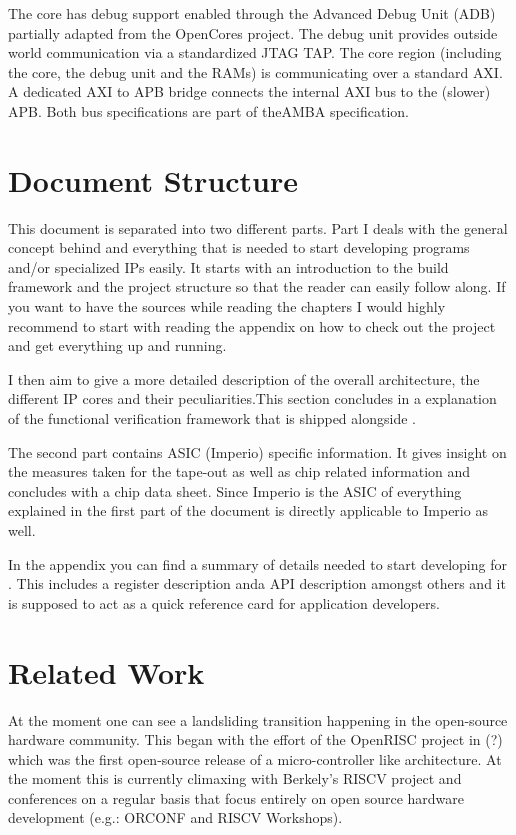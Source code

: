 The core has debug support enabled through the Advanced Debug Unit (ADB) partially adapted from the OpenCores project. The debug unit provides outside world communication via a standardized JTAG TAP. The core region (including the core, the debug unit and the RAMs) is communicating over a standard \gls{AXI}. A dedicated AXI to APB bridge connects the internal AXI bus to the (slower) \gls{APB}. Both bus specifications are part of the\gls{AMBA} specification.

\section{Document Structure}

This document is separated into two different parts. Part I deals with the general concept behind \pulpino and everything that is needed to start developing programs and/or specialized IPs easily. It starts with an introduction to the build framework and the project structure so that the reader can easily follow along. If you want to have the sources while reading the chapters I would highly recommend to start with reading the appendix on how to check out the project and get everything up and running.

I then aim to give a more detailed description of the overall architecture, the different IP cores and their peculiarities.This section concludes in a explanation of the functional verification framework that is shipped alongside \pulpino.

The second part contains ASIC (Imperio) specific information. It gives insight on the measures taken for the tape-out as well as chip related information and concludes with a chip data sheet. Since Imperio is the ASIC of \pulpino everything explained in the first part of the document is directly applicable to Imperio as well.

In the appendix you can find a summary of details needed to start developing for \pulpino. This includes a register description anda API description amongst others and it is supposed to act as a quick reference card for application developers.

\section{Related Work}

At the moment one can see a landsliding transition happening in the open-source hardware community. This began with the effort of the OpenRISC project in (?) which was the first open-source release of a micro-controller like architecture.
At the moment this is currently climaxing with Berkely's RISCV project and conferences on a regular basis that focus entirely on open source hardware development (e.g.: ORCONF and RISCV Workshops).

